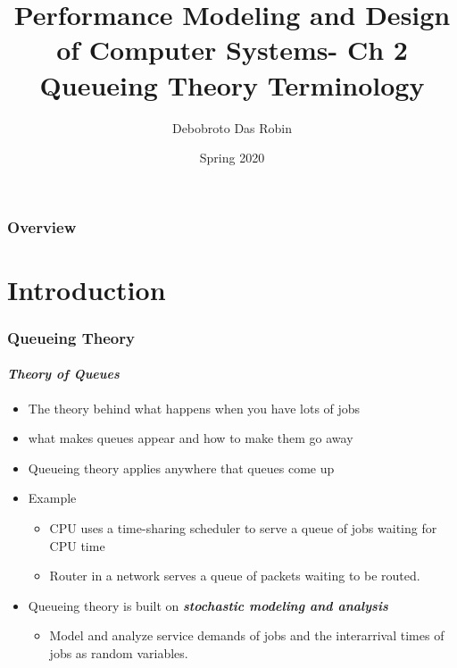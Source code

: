 \documentclass{beamer}
\title{Performance Modeling and
Design of Computer Systems- Ch 2 \\
Queueing Theory Terminology}
\author{Debobroto Das Robin} %
\institute{Kent State University}
\date{Spring 2020}
\begin{document}
\begin{frame}
        \titlepage
        \begin{center}
    \href{mailto:drobin@kent.edu}{}
        \end{center}
\end{frame}

\begin{frame}
\frametitle{Overview} %
\tableofcontents %
\end{frame}
\section{Introduction}



\begin{frame}
    \frametitle{Queueing Theory}
    \framesubtitle{\textbf{\textit{Theory of Queues}}}
	\begin{itemize}
		\item The theory behind what happens when you have lots of jobs
		\item what makes queues appear and how to make them go away
		\item Queueing theory applies anywhere that queues come up
		\item Example
			\begin{itemize}
			\item CPU uses a time-sharing scheduler to serve a queue of jobs waiting for CPU time
			\item Router in a network serves a queue of packets waiting to be routed.
			\end{itemize}
		\item Queueing theory is built on  \textbf{\textit{stochastic modeling and analysis}} 						\begin{itemize}
					\item Model and analyze  service demands of jobs and the interarrival times of 							jobs as random 	variables. 
				\end{itemize}		  
	\end{itemize}	    
    
\end{frame}
\end{document}
